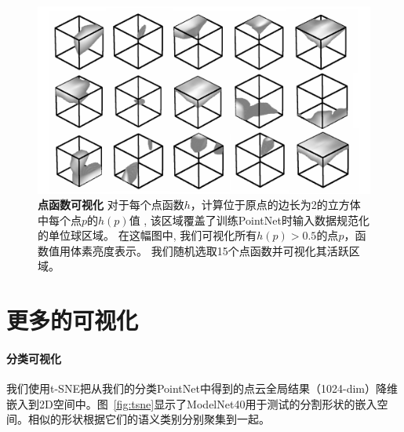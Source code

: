 \begin{figure}[h!]
    \centering
    \includegraphics[width=0.7\linewidth]{fig/kernels.pdf}
    \caption{\textbf{点函数可视化} 对于每个点函数$h$，计算位于原点的边长为2的立方体中每个点$p$的$h(p)$值 , 该区域覆盖了训练PointNet时输入数据规范化的单位球区域。 在这幅图中, 我们可视化所有$h(p)>0.5$的点$p$，函数值用体素亮度表示。 我们随机选取15个点函数并可视化其活跃区域。}
    \label{fig:functions}
\end{figure}

\section{更多的可视化}
\label{sec:visu}
\paragraph{分类可视化}

我们使用t-SNE\cite{maaten2008visualizing}把从我们的分类PointNet中得到的点云全局结果（1024-dim）降维嵌入到2D空间中。图~\ref{fig:tsne}显示了ModelNet40用于测试的分割形状的嵌入空间。相似的形状根据它们的语义类别分别聚集到一起。

